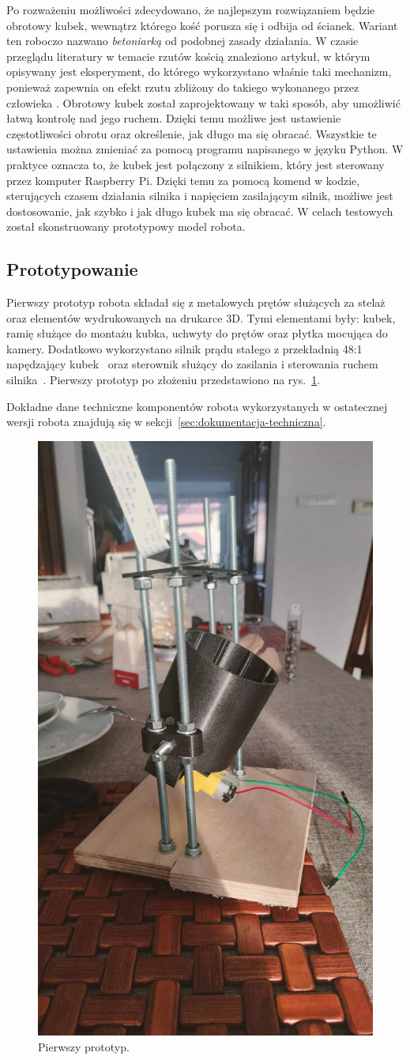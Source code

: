 Po rozważeniu możliwości
zdecydowano, że najlepszym rozwiązaniem będzie obrotowy kubek, wewnątrz którego kość porusza się i odbija od ścianek. Wariant ten roboczo nazwano \textit{betoniarką} od podobnej
zasady działania. W czasie przeglądu literatury w temacie rzutów kością znaleziono artykuł, w którym opisywany jest eksperyment, do którego wykorzystano właśnie taki 
mechanizm, ponieważ zapewnia on efekt rzutu zbliżony do takiego wykonanego przez człowieka \cite{PK}. Obrotowy kubek został zaprojektowany w taki 
sposób, aby umożliwić łatwą kontrolę nad jego ruchem. Dzięki temu możliwe jest ustawienie częstotliwości obrotu oraz określenie, jak długo ma się obracać. Wszystkie te ustawienia 
można zmieniać za pomocą programu napisanego w języku Python. W praktyce oznacza to, że kubek jest połączony z silnikiem, który jest sterowany przez komputer 
Raspberry Pi. Dzięki temu za pomocą komend w kodzie, sterujących czasem działania silnika i napięciem zasilającym silnik, możliwe jest dostosowanie, jak szybko i jak długo kubek ma się obracać.
W celach testowych został skonstruowany prototypowy model robota.

\subsection{Prototypowanie}\label{subsec:prototypowanie}

Pierwszy prototyp robota składał się z metalowych prętów służących za stelaż oraz elementów wydrukowanych na drukarce 3D.
Tymi elementami były: kubek, ramię służące do montażu kubka, uchwyty do prętów oraz płytka mocująca do kamery. Dodatkowo
wykorzystano silnik prądu stałego z przekładnią 48:1 napędzający kubek~\cite{wheel} oraz sterownik służący do zasilania i sterowania ruchem silnika~\cite{L298}.
Pierwszy prototyp po złożeniu przedstawiono na rys.~\ref{fig:pierwszy}.

Dokładne dane techniczne komponentów robota wykorzystanych w ostatecznej wersji robota znajdują się w sekcji~\ref{sec:dokumentacja-techniczna}.

\begin{figure}[H]
    \centering
    \includegraphics[width=0.25\linewidth, trim={35mm 75mm 35mm 30mm}, clip]{chapters/03-praca-wlasna/figures/pierwszy}
    \caption{\label{fig:pierwszy}Pierwszy prototyp.}
\end{figure}

